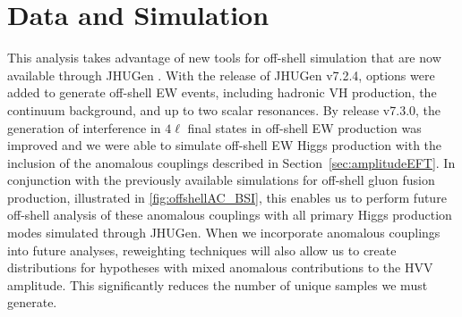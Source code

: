 



\section{Data and Simulation}


This analysis takes advantage of new tools for off-shell simulation that are now available through JHUGen \cite{2010,2012,2014,2016,2020,2021}. With the release of JHUGen v7.2.4, options were added to generate off-shell EW events, including hadronic VH production, the continuum background, and up to two scalar resonances. By release v7.3.0, the generation of interference in $4\ell$ final states in off-shell EW production was improved and we were able to simulate off-shell EW Higgs production with the inclusion of the anomalous couplings described in Section~\ref{sec:amplitudeEFT}. In conjunction with the previously available simulations for off-shell gluon fusion production, illustrated in \ref{fig:offshellAC_BSI}, this enables us to perform future off-shell analysis of these anomalous couplings with all primary Higgs production modes simulated through JHUGen. When we incorporate anomalous couplings into future analyses, reweighting techniques will also allow us to create distributions for hypotheses with mixed anomalous contributions to the HVV amplitude. This significantly reduces the number of unique samples we must generate. 

